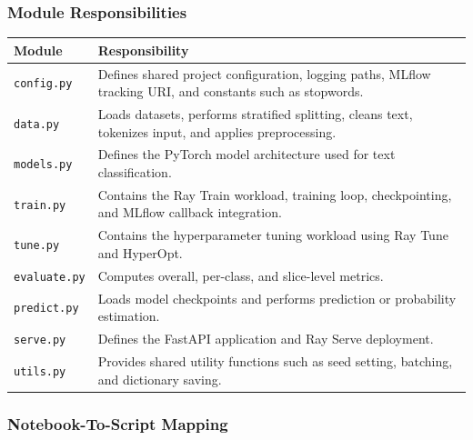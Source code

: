 \documentclass[11pt,a4paper]{article}
\begin{document}
\subsubsection{Module Responsibilities}

\begin{longtable}{p{} p{}}
\toprule
\textbf{Module} & \textbf{Responsibility} \\
\midrule
\texttt{config.py} & Defines shared project configuration, logging paths, MLflow tracking URI, and constants such as stopwords. \\
\texttt{data.py} & Loads datasets, performs stratified splitting, cleans text, tokenizes input, and applies preprocessing. \\
\texttt{models.py} & Defines the PyTorch model architecture used for text classification. \\
\texttt{train.py} & Contains the Ray Train workload, training loop, checkpointing, and MLflow callback integration. \\
\texttt{tune.py} & Contains the hyperparameter tuning workload using Ray Tune and HyperOpt. \\
\texttt{evaluate.py} & Computes overall, per-class, and slice-level metrics. \\
\texttt{predict.py} & Loads model checkpoints and performs prediction or probability estimation. \\
\texttt{serve.py} & Defines the FastAPI application and Ray Serve deployment. \\
\texttt{utils.py} & Provides shared utility functions such as seed setting, batching, and dictionary saving. \\
\bottomrule
\end{longtable}

\subsubsection{Notebook-To-Script Mapping}
\end{document}
